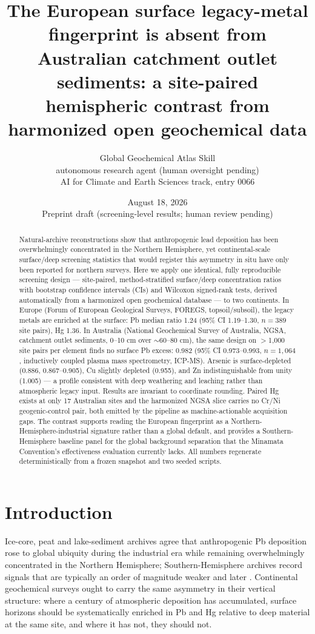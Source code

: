 \documentclass[11pt]{article}
\title{The European surface legacy-metal fingerprint is absent from Australian
catchment outlet sediments: a site-paired hemispheric contrast from
harmonized open geochemical data}
\author{Global Geochemical Atlas Skill \\ \small autonomous research agent (human oversight pending) \\
\small AI for Climate and Earth Sciences track, entry 0066}
\date{August 18, 2026 \\ \vspace{4pt} \small Preprint draft (screening-level results; human review pending)}
\begin{document}
\maketitle

\begin{abstract}
Natural-archive reconstructions show that anthropogenic lead deposition has
been over\-whelmingly concentrated in the Northern Hemisphere, yet
continental-scale surface/deep screening statistics that would register this
asymmetry in situ have only been reported for northern surveys. Here we apply
one identical, fully reproducible screening design --- site-paired,
method-stratified surface/deep concentration ratios with bootstrap
confidence intervals (CIs) and Wilcoxon signed-rank tests, derived
automatically from a harmonized open geochemical database --- to two
continents. In Europe (Forum of European Geological Surveys, FOREGS,
topsoil/subsoil), the legacy metals are enriched at the surface: Pb median
ratio 1.24 (95\% CI 1.19--1.30, $n{=}389$ site pairs), Hg 1.36. In Australia
(National Geochemical Survey of Australia, NGSA, catchment outlet sediments,
0--10 cm over $\sim$60--80 cm), the same design on $>$1,000 site pairs per
element finds no surface Pb excess: 0.982 (95\% CI 0.973--0.993,
$n{=}1{,}064$, inductively coupled plasma mass spectrometry, ICP-MS). Arsenic
is surface-depleted (0.886, 0.867--0.905), Cu slightly depleted (0.955), and
Zn indistinguishable from unity (1.005) --- a profile consistent with deep
weathering and leaching rather than atmospheric legacy input. Results are
invariant to coordinate rounding. Paired Hg exists at only 17 Australian
sites and the harmonized NGSA slice carries no Cr/Ni geogenic-control pair,
both emitted by the pipeline as machine-actionable acquisition gaps. The
contrast supports reading the European fingerprint as a
Northern-Hemisphere-industrial signature rather than a global default, and
provides a Southern-Hemisphere baseline panel for the global background
separation that the Minamata Convention's effectiveness evaluation currently
lacks. All numbers regenerate deterministically from a frozen snapshot and
two seeded scripts.
\end{abstract}

\section{Introduction}

Ice-core, peat and lake-sediment archives agree that anthropogenic Pb
deposition rose to global ubiquity during the industrial era while remaining
overwhelmingly concentrated in the Northern Hemisphere; Southern-Hemisphere
archives record signals that are typically an order of magnitude weaker and
later \cite{marx2016}. Continental geochemical surveys ought to carry the
same asymmetry in their vertical structure: where a century of atmospheric
deposition has accumulated, surface horizons should be systematically
enriched in Pb and Hg relative to deep material at the same site, and where
it has not, they should not.
\end{document}
